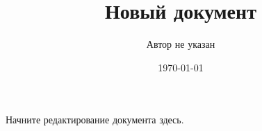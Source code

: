 \documentclass[11pt,a4paper]{article}
\title{Новый документ}
\author{Автор не указан}
\date{\today}
\begin{document}
\maketitle
Начните редактирование документа здесь.
\end{document}
